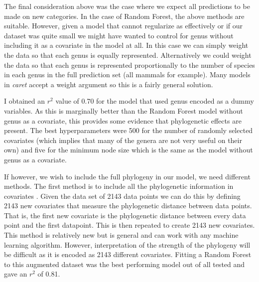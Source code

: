 \documentclass[12pt]{article}
\begin{document}
The final consideration above was the case where we expect all predictions to be made on new categories.
In the case of Random Forest, the above methods are suitable.
However, given a model that cannot regularize as effectively or if our dataset was quite small we might have wanted to control for genus without including it as a covariate in the model at all.
In this case we can simply weight the data so that each genus is equally represented.
Alternatively we could weight the data so that each genus is represented proportionally to the number of species in each genus in the full prediction set (all mammals for example).
Many models in \emph{caret} accept a weight argument so this is a fairly general solution.

I obtained an \(r^2\) value of 0.70 for the model that used genus encoded as a  dummy variables.
As this is marginally better than the Random Forest model without genus as a covariate, this provides some evidence that phylogenetic effects are present.
The best hyperparameters were 500 for the number of randomly selected covariates  (which implies that many of the genera are not very useful on their own) and five for the minimum node size which is the same as the model without genus as a covariate.

If however, we wish to include the full phylogeny in our model, we need different methods.
The first method is to include all the phylogenetic information in covariates \citep{hengl2018random}.
Given the data set of 2143 data points we can do this by defining 2143 new covariates that measure the phylogenetic distance between data points.
That is, the first new covariate is the phylogenetic distance between every data point and the first datapoint.
This is then repeated to create 2143 new covariates.
This method is relatively new but is general and can work with any machine learning algorithm.
However, interpretation of the strength of the phylogeny will be difficult as it is encoded as 2143 different covariates.
Fitting a Random Forest to this augmented dataset was the best performing model out of all tested and gave an \(r^2\) of 0.81.
\end{document}
